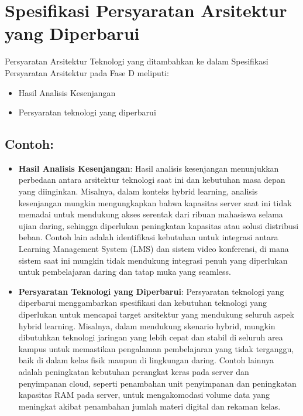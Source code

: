 \section{Spesifikasi Persyaratan Arsitektur yang Diperbarui}
\label{sec:spesifikasi_kebutuhan_arsitektur_teknologi}
Persyaratan Arsitektur Teknologi yang ditambahkan ke dalam Spesifikasi Persyaratan Arsitektur pada Fase D meliputi:
\begin{itemize}
	\item Hasil Analisis Kesenjangan
	\item Persyaratan teknologi yang diperbarui
\end{itemize}

\subsection*{Contoh:}

\begin{itemize}
	\item \textbf{Hasil Analisis Kesenjangan}: Hasil analisis kesenjangan menunjukkan perbedaan antara arsitektur teknologi saat ini dan kebutuhan masa depan yang diinginkan. Misalnya, dalam konteks hybrid learning, analisis kesenjangan mungkin mengungkapkan bahwa kapasitas server saat ini tidak memadai untuk mendukung akses serentak dari ribuan mahasiswa selama ujian daring, sehingga diperlukan peningkatan kapasitas atau solusi distribusi beban. Contoh lain adalah identifikasi kebutuhan untuk integrasi antara Learning Management System (LMS) dan sistem video konferensi, di mana sistem saat ini mungkin tidak mendukung integrasi penuh yang diperlukan untuk pembelajaran daring dan tatap muka yang seamless.
	
	\item \textbf{Persyaratan Teknologi yang Diperbarui}: Persyaratan teknologi yang diperbarui menggambarkan spesifikasi dan kebutuhan teknologi yang diperlukan untuk mencapai target arsitektur yang mendukung seluruh aspek hybrid learning. Misalnya, dalam mendukung skenario hybrid, mungkin dibutuhkan teknologi jaringan yang lebih cepat dan stabil di seluruh area kampus untuk memastikan pengalaman pembelajaran yang tidak terganggu, baik di dalam kelas fisik maupun di lingkungan daring. Contoh lainnya adalah peningkatan kebutuhan perangkat keras pada server dan penyimpanan cloud, seperti penambahan unit penyimpanan dan peningkatan kapasitas RAM pada server, untuk mengakomodasi volume data yang meningkat akibat penambahan jumlah materi digital dan rekaman kelas.
\end{itemize}

